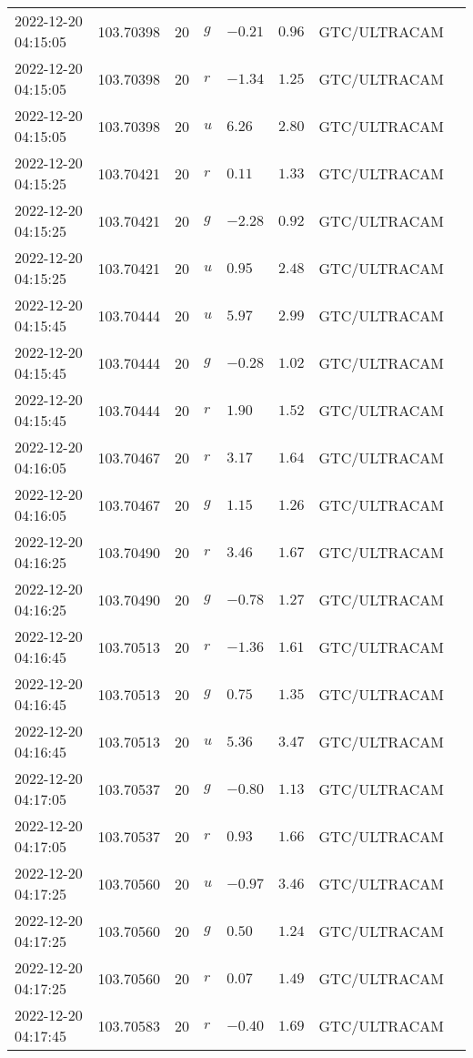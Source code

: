 \documentclass{nature_plusfigure}
\begin{document}
\begin{supplement}
\begin{center}
\begin{longtable}{llllllll}
2022-12-20 04:15:05 & 103.70398 & 20 & $g$ & $-0.21$ & $0.96$ & GTC/ULTRACAM &  \\ 
2022-12-20 04:15:05 & 103.70398 & 20 & $r$ & $-1.34$ & $1.25$ & GTC/ULTRACAM &  \\ 
2022-12-20 04:15:05 & 103.70398 & 20 & $u$ & $6.26$ & $2.80$ & GTC/ULTRACAM &  \\ 
2022-12-20 04:15:25 & 103.70421 & 20 & $r$ & $0.11$ & $1.33$ & GTC/ULTRACAM &  \\ 
2022-12-20 04:15:25 & 103.70421 & 20 & $g$ & $-2.28$ & $0.92$ & GTC/ULTRACAM &  \\ 
2022-12-20 04:15:25 & 103.70421 & 20 & $u$ & $0.95$ & $2.48$ & GTC/ULTRACAM &  \\ 
2022-12-20 04:15:45 & 103.70444 & 20 & $u$ & $5.97$ & $2.99$ & GTC/ULTRACAM &  \\ 
2022-12-20 04:15:45 & 103.70444 & 20 & $g$ & $-0.28$ & $1.02$ & GTC/ULTRACAM &  \\ 
2022-12-20 04:15:45 & 103.70444 & 20 & $r$ & $1.90$ & $1.52$ & GTC/ULTRACAM &  \\ 
2022-12-20 04:16:05 & 103.70467 & 20 & $r$ & $3.17$ & $1.64$ & GTC/ULTRACAM &  \\ 
2022-12-20 04:16:05 & 103.70467 & 20 & $g$ & $1.15$ & $1.26$ & GTC/ULTRACAM &  \\ 
2022-12-20 04:16:25 & 103.70490 & 20 & $r$ & $3.46$ & $1.67$ & GTC/ULTRACAM &  \\ 
2022-12-20 04:16:25 & 103.70490 & 20 & $g$ & $-0.78$ & $1.27$ & GTC/ULTRACAM &  \\ 
2022-12-20 04:16:45 & 103.70513 & 20 & $r$ & $-1.36$ & $1.61$ & GTC/ULTRACAM &  \\ 
2022-12-20 04:16:45 & 103.70513 & 20 & $g$ & $0.75$ & $1.35$ & GTC/ULTRACAM &  \\ 
2022-12-20 04:16:45 & 103.70513 & 20 & $u$ & $5.36$ & $3.47$ & GTC/ULTRACAM &  \\ 
2022-12-20 04:17:05 & 103.70537 & 20 & $g$ & $-0.80$ & $1.13$ & GTC/ULTRACAM &  \\ 
2022-12-20 04:17:05 & 103.70537 & 20 & $r$ & $0.93$ & $1.66$ & GTC/ULTRACAM &  \\ 
2022-12-20 04:17:25 & 103.70560 & 20 & $u$ & $-0.97$ & $3.46$ & GTC/ULTRACAM &  \\ 
2022-12-20 04:17:25 & 103.70560 & 20 & $g$ & $0.50$ & $1.24$ & GTC/ULTRACAM &  \\ 
2022-12-20 04:17:25 & 103.70560 & 20 & $r$ & $0.07$ & $1.49$ & GTC/ULTRACAM &  \\ 
2022-12-20 04:17:45 & 103.70583 & 20 & $r$ & $-0.40$ & $1.69$ & GTC/ULTRACAM &  \\ 

\end{longtable}
\end{center}
\end{supplement}
\end{document}
